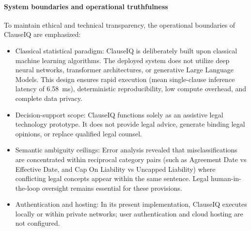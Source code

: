 \paragraph*{System boundaries and operational truthfulness}
To maintain ethical and technical transparency, the operational boundaries of ClauseIQ are emphasized:
\begin{itemize}
    \item Classical statistical paradigm: ClauseIQ is deliberately built upon classical machine learning algorithms. The deployed system does not utilize deep neural networks, transformer architectures, or generative Large Language Models. This design ensures rapid execution (mean single-clause inference latency of 6.58~ms), deterministic reproducibility, low compute overhead, and complete data privacy.
    \item Decision-support scope: ClauseIQ functions solely as an assistive legal technology prototype. It does not provide legal advice, generate binding legal opinions, or replace qualified legal counsel.
    \item Semantic ambiguity ceilings: Error analysis revealed that misclassifications are concentrated within reciprocal category pairs (such as Agreement Date vs Effective Date, and Cap On Liability vs Uncapped Liability) where conflicting legal concepts appear within the same sentence. Legal human-in-the-loop oversight remains essential for these provisions.
    \item Authentication and hosting: In its present implementation, ClauseIQ executes locally or within private networks; user authentication and cloud hosting are not configured.
\end{itemize}
